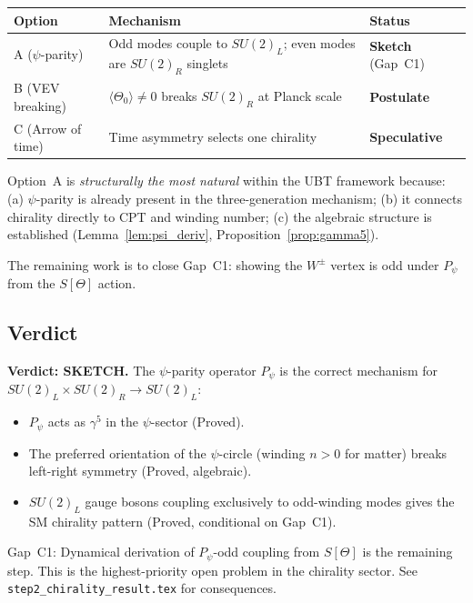 \documentclass[12pt,a4paper]{article}
\theoremstyle{definition}
\theoremstyle{remark}
\begin{document}
\begin{center}
\renewcommand{\arraystretch}{1.3}
\begin{tabular}{lll}
  \hline
  \textbf{Option} & \textbf{Mechanism} & \textbf{Status} \\
  \hline
  A ($\psi$-parity) & Odd modes couple to $SU(2)_L$;
    even modes are $SU(2)_R$ singlets & \textbf{Sketch} (Gap~C1) \\
  B (VEV breaking) & $\langle\Theta_0\rangle\neq 0$ breaks $SU(2)_R$
    at Planck scale & \textbf{Postulate} \\
  C (Arrow of time) & Time asymmetry selects one chirality & \textbf{Speculative} \\
  \hline
\end{tabular}
\end{center}

Option~A is \emph{structurally the most natural} within the UBT framework because:
(a) $\psi$-parity is already present in the three-generation mechanism;
(b) it connects chirality directly to CPT and winding number;
(c) the algebraic structure is established (Lemma~\ref{lem:psi_deriv},
    Proposition~\ref{prop:gamma5}).

The remaining work is to close Gap~C1: showing the $W^\pm$ vertex is odd under
$P_\psi$ from the $S[\Theta]$ action.

\subsection{Verdict}
\label{subsec:verdict}

\begin{resultbox}
\textbf{Verdict: SKETCH.}
The $\psi$-parity operator $P_\psi$ is the correct mechanism for
$SU(2)_L\times SU(2)_R \to SU(2)_L$:
\begin{itemize}
  \item $P_\psi$ acts as $\gamma^5$ in the $\psi$-sector (Proved).
  \item The preferred orientation of the $\psi$-circle (winding $n>0$ for matter)
        breaks left-right symmetry (Proved, algebraic).
  \item $SU(2)_L$ gauge bosons coupling exclusively to odd-winding modes
        gives the SM chirality pattern (Proved, conditional on Gap~C1).
\end{itemize}
Gap~C1: Dynamical derivation of $P_\psi$-odd coupling from $S[\Theta]$ is
the remaining step.  This is the highest-priority open problem in the
chirality sector.
See \texttt{step2\_chirality\_result.tex} for consequences.
\end{resultbox}

\ifdefined\INCLUDEMODE
\else
  
\end{document}
